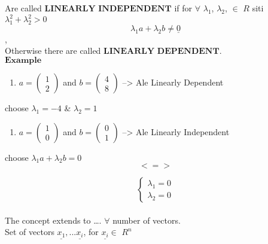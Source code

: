 \documentclass[]{article}
\providecommand{\tightlist}{%
  \setlength{\itemsep}{0pt}\setlength{\parskip}{0pt}}
\begin{document}
Are called \(\textbf{LINEARLY INDEPENDENT}\) if for \(\forall\)
\(\lambda_1\), \(\lambda_2\), \(\in\) \(R\) siti
\(\lambda^{2}_1 + \lambda^{2}_2 > 0\)\\
 \[\lambda_1a + \lambda_2b \neq \underline{0}\],\\

Otherwise there are called \(\textbf{LINEARLY DEPENDENT}\).\\

\(\mathbf{Example}\)\\

\begin{enumerate}
\def\labelenumi{\alph{enumi})}
\tightlist
\item
  \(a=\begin{pmatrix} 1\\ 2 \end{pmatrix}\) and
  \(b=\begin{pmatrix} 4\\ 8 \end{pmatrix}\) --\textgreater{} Ale
  Linearly Dependent\\
\end{enumerate}

choose \(\lambda_1 = -4\) \& \(\lambda_2 = 1\)\\

\begin{enumerate}
\def\labelenumi{\alph{enumi})}
\setcounter{enumi}{1}
\tightlist
\item
  \(a=\begin{pmatrix} 1\\ 0 \end{pmatrix}\) and
  \(b=\begin{pmatrix} 0\\ 1 \end{pmatrix}\) --\textgreater{} Ale
  Linearly Independent\\
\end{enumerate}

choose \(\lambda_1a +\lambda_2b= 0\)\\
 \[<=>\]

\[\begin{cases} \lambda_1= 0\\ \lambda_2 = 0 \end{cases}\]\\

The concept extends to \ldots{}. \(\forall\) number of vectors.\\

Set of vectors \(\underline{x_1},...\underline{x_i}\), for
\(\underline{x_i} \in\) \(R^{n}\)\\
\end{document}
